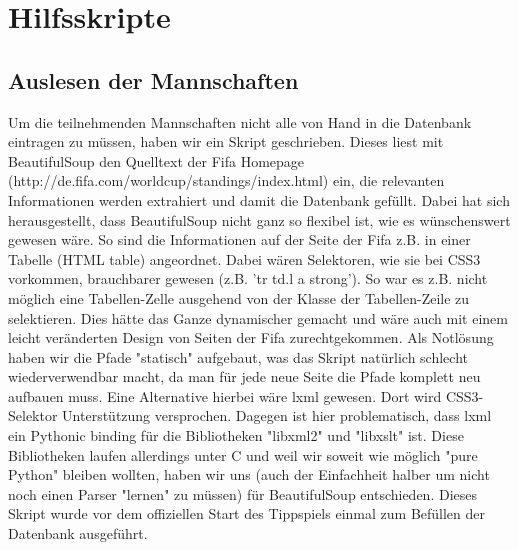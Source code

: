 \chapter{Hilfsskripte}\label{hilfsskripte}
\section{Auslesen der Mannschaften}
Um die teilnehmenden Mannschaften nicht alle von Hand in die Datenbank
eintragen zu müssen, haben wir ein Skript geschrieben. Dieses liest mit 
BeautifulSoup den Quelltext der Fifa Homepage 
(http://de.fifa.com/worldcup/standings/index.html) ein, die relevanten 
Informationen werden extrahiert und damit die Datenbank gefüllt. Dabei hat sich
herausgestellt, dass BeautifulSoup nicht ganz so flexibel ist, wie es 
wünschenswert gewesen wäre. So sind die Informationen auf der Seite der Fifa 
z.B. in einer Tabelle (HTML table) angeordnet. Dabei wären Selektoren, wie sie 
bei CSS3 vorkommen, brauchbarer gewesen (z.B. 'tr td.l a strong'). So war es 
z.B. nicht möglich eine Tabellen-Zelle ausgehend von der Klasse der 
Tabellen-Zeile zu selektieren. Dies hätte das Ganze dynamischer gemacht und 
wäre auch mit einem leicht veränderten Design von Seiten der Fifa 
zurechtgekommen. Als Notlösung haben wir die Pfade "statisch" aufgebaut, was
das Skript natürlich schlecht wiederverwendbar macht, da man für jede neue 
Seite die Pfade komplett neu aufbauen muss. Eine Alternative hierbei wäre lxml 
gewesen. Dort wird CSS3-Selektor Unterstützung versprochen. Dagegen ist hier 
problematisch, dass lxml ein Pythonic binding für die Bibliotheken "libxml2"
und  "libxslt" ist. Diese Bibliotheken laufen allerdings unter C und weil wir 
soweit wie möglich "pure Python" bleiben wollten, haben wir uns (auch der 
Einfachheit halber um nicht noch einen Parser "lernen" zu müssen) für 
BeautifulSoup entschieden. Dieses Skript wurde vor dem offiziellen Start des 
Tippspiels einmal zum Befüllen der Datenbank ausgeführt.

